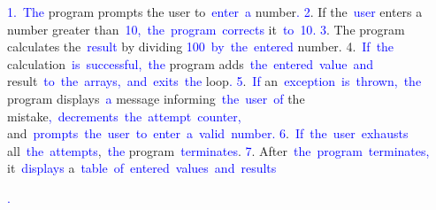 \documentclass{article}
\begin{document}
\begin{tcolorbox}[colframe=black,colback=white]
{{}\textcolor{blue}{1}\textcolor{blue}{.}\textcolor{blue}{~The} program prompts the user to\textcolor{blue}{~enter}\textcolor{blue}{~a} number\textcolor{blue}{.
}\textcolor{blue}{2}. If the\textcolor{blue}{~user} enters a number greater than\textcolor{blue}{~}\textcolor{blue}{10}\textcolor{blue}{,}\textcolor{blue}{~the}\textcolor{blue}{~program}\textcolor{blue}{~correct}\textcolor{blue}{s} it\textcolor{blue}{~to}\textcolor{blue}{~}\textcolor{blue}{10}\textcolor{blue}{.
}\textcolor{blue}{3}. The program calculates the\textcolor{blue}{~result} by dividing \textcolor{blue}{100}\textcolor{blue}{~by}\textcolor{blue}{~the}\textcolor{blue}{~entered} number.
4.\textcolor{blue}{~If}\textcolor{blue}{~the} calculation\textcolor{blue}{~is}\textcolor{blue}{~successful}\textcolor{blue}{,}\textcolor{blue}{~the} program adds\textcolor{blue}{~the}\textcolor{blue}{~entered}\textcolor{blue}{~value}\textcolor{blue}{~and} result\textcolor{blue}{~to}\textcolor{blue}{~the}\textcolor{blue}{~arrays}\textcolor{blue}{,}\textcolor{blue}{~and}\textcolor{blue}{~exits}\textcolor{blue}{~the} loop\textcolor{blue}{.
}\textcolor{blue}{5}.\textcolor{blue}{~If} an\textcolor{blue}{~exception}\textcolor{blue}{~is}\textcolor{blue}{~thrown}\textcolor{blue}{,}\textcolor{blue}{~the} program displays\textcolor{blue}{~a} message informing\textcolor{blue}{~the}\textcolor{blue}{~user}\textcolor{blue}{~of} the mistake\textcolor{blue}{,}\textcolor{blue}{~decre}\textcolor{blue}{ments}\textcolor{blue}{~the}\textcolor{blue}{~attempt}\textcolor{blue}{~counter}\textcolor{blue}{,} and\textcolor{blue}{~prompts}\textcolor{blue}{~the}\textcolor{blue}{~user}\textcolor{blue}{~to}\textcolor{blue}{~enter}\textcolor{blue}{~a}\textcolor{blue}{~valid}\textcolor{blue}{~number}\textcolor{blue}{.
}\textcolor{blue}{6}.\textcolor{blue}{~If}\textcolor{blue}{~the}\textcolor{blue}{~user}\textcolor{blue}{~exhaust}\textcolor{blue}{s} all\textcolor{blue}{~the}\textcolor{blue}{~attempts},\textcolor{blue}{~the} program\textcolor{blue}{~terminates}.
\textcolor{blue}{7}. After\textcolor{blue}{~the}\textcolor{blue}{~program}\textcolor{blue}{~terminates}\textcolor{blue}{,} it\textcolor{blue}{~displays} a\textcolor{blue}{~table}\textcolor{blue}{~of}\textcolor{blue}{~entered}\textcolor{blue}{~values}\textcolor{blue}{~and}\textcolor{blue}{~results}\textcolor{blue}{.

}}
\end{tcolorbox}
\end{document}
